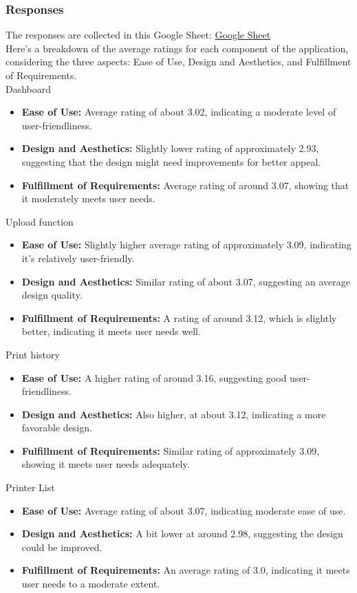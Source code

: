 \subsubsection{Responses}
The responses are collected in this Google Sheet: \href{https://docs.google.com/spreadsheets/d/19ywJ2WqR-1UwOe_dwIv6s4Ub5834-oyfKyqbfBqh974/edit#gid=1365939538}{Google Sheet}\\
\indent Here's a breakdown of the average ratings for each component of the application, considering the three aspects: Ease of Use, Design and Aesthetics, and Fulfillment of Requirements.\\
\indent Dashboard
\begin{itemize}[label =$\bullet$]
    \item \textbf{Ease of Use:} Average rating of about 3.02, indicating a moderate level of user-friendliness.
    \item \textbf{Design and Aesthetics:} Slightly lower rating of approximately 2.93, suggesting that the design might need improvements for better appeal.
    \item \textbf{Fulfillment of Requirements:} Average rating of around 3.07, showing that it moderately meets user needs.
\end{itemize}
\indent \indent Upload function
\begin{itemize}[label =$\bullet$]
    \item \textbf{Ease of Use:} Slightly higher average rating of approximately 3.09, indicating it's relatively user-friendly.
    \item \textbf{Design and Aesthetics:} Similar rating of about 3.07, suggesting an average design quality.
    \item \textbf{Fulfillment of Requirements:} A rating of around 3.12, which is slightly better, indicating it meets user needs well.
\end{itemize}
\indent \indent Print history
\begin{itemize}[label =$\bullet$]
    \item \textbf{Ease of Use:} A higher rating of around 3.16, suggesting good user-friendliness.
    \item \textbf{Design and Aesthetics:} Also higher, at about 3.12, indicating a more favorable design.
    \item \textbf{Fulfillment of Requirements:} Similar rating of approximately 3.09, showing it meets user needs adequately.
\end{itemize}
\indent \indent Printer List
\begin{itemize}[label =$\bullet$]
    \item \textbf{Ease of Use:} Average rating of about 3.07, indicating moderate ease of use.
    \item \textbf{Design and Aesthetics:} A bit lower at around 2.98, suggesting the design could be improved.
    \item \textbf{Fulfillment of Requirements:} An average rating of 3.0, indicating it meets user needs to a moderate extent.
\end{itemize}
